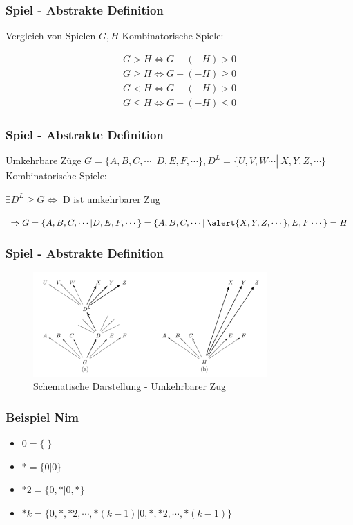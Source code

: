 \documentclass[12pt, aspectratio=169]{beamer}
\begin{document}
\begin{frame}
    \frametitle{Spiel - Abstrakte Definition}
    \begin{block}{Vergleich von Spielen}
    $G, H$ Kombinatorische Spiele:
    
    \begin{align*}
        G > H \iff G + (-H) > 0 \\
        G \geq H \iff G + (-H) \geq 0 \\
        G < H \iff G + (-H) > 0 \\
        G \leq H \iff G + (-H) \leq 0
    \end{align*}
    
    \end{block}
\end{frame}

\begin{frame}
    \frametitle{Spiel - Abstrakte Definition}
    \begin{block}{Umkehrbare Züge}
    $G = \{A,B,C,\cdots | \: D,E,F,\cdots\}, D^L = \{U,V,W\cdots | \: X,Y,Z,\cdots\}$ Kombinatorische Spiele: \\
    \begin{center}
        $\exists D^L \geq G \iff$ D ist umkehrbarer Zug
    \end{center}
    $\Rightarrow G = \{A,B,C,\cdots | D,E,F,\cdots\} = \{A,B,C,\cdots | \: \alert{X,Y,Z,\cdots},E,F\cdots\} = H$
    \end{block}
\end{frame}

\begin{frame}
    \frametitle{Spiel - Abstrakte Definition}
    \begin{figure}
        \centering
        \includegraphics[width=0.8\textwidth]{pic/reversible.png}
        \caption{Schematische Darstellung - Umkehrbarer Zug \tiny{\cite{ww}}}
    \end{figure}
\end{frame}

\begin{frame}
    \frametitle{Beispiel Nim}
    \begin{itemize}
        \item $0 = \{|\}$
        \item $* = \{0|0\}$
        \item $*2 = \{0,*|0,*\}$
        \item $*k = \{0,*,*2,\cdots,*(k-1)|0,*,*2,\cdots,*(k-1)\}$
    \end{itemize}
\end{frame}
\end{document}
